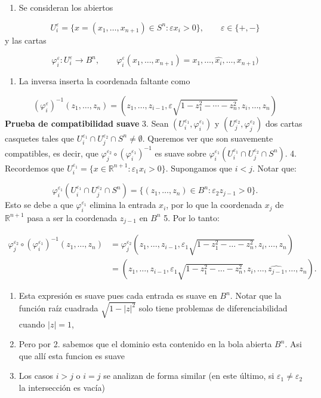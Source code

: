 \begin{bookproof}{}
\begin{enumerate}
\item Se consideran los abiertos
\end{enumerate}
\[
U_i^\varepsilon=\{x=(x_1,\dots,x_{n+1})\in S^n : \varepsilon x_i>0\},\qquad \varepsilon\in\{+,-\}
\]
y las cartas

\[
\varphi_i^\varepsilon:U_i^\varepsilon\to B^n,\qquad\varphi_i^\varepsilon(x_1,\dots,x_{n+1})=x_1,\dots,\widehat{x_i},\dots,x_{n+1})
\]
\begin{enumerate}[start=2]
\item La inversa inserta la coordenada faltante como
\end{enumerate}
\[
\left(\varphi_i^\varepsilon\right)^{-1}(z_1,\dots,z_n)=(z_1,\dots,z_{i-1},\varepsilon\sqrt{1-z_1^2-\cdots-z_n^2},z_i,\dots,z_n)
\]
\textbf{Prueba de compatibilidad suave} 3. Sean $(U_i^{\varepsilon_1}, \varphi_i^{\varepsilon_1})$ y $(U_j^{\varepsilon_2}, \varphi_j^{\varepsilon_2})$ dos cartas casquetes tales que $U_i^{\varepsilon_1} \cap U_j^{\varepsilon_2} \cap S^n \neq \emptyset$. Queremos ver que son suavemente compatibles, es decir, que $\varphi_j^{\varepsilon_2} \circ (\varphi_i^{\varepsilon_1})^{-1}$ es suave sobre $\varphi_i^{\varepsilon_1}(U_i^{\varepsilon_1} \cap U_j^{\varepsilon_2} \cap S^n)$. 4. Recordemos que $U_i^{\varepsilon_1} = \{ x \in \mathbb{R}^{n+1} : \varepsilon_1 x_i > 0 \}$. Supongamos que $i < j$. Notar que:

\[
\varphi_i^{\varepsilon_1}(U_i^{\varepsilon_1} \cap U_j^{\varepsilon_2} \cap S^n) = \{ (z_1, \dots, z_n) \in B^n : \varepsilon_2 z_{j-1} > 0 \}.
\]
Esto se debe a que $\varphi_i^{\varepsilon_1}$ elimina la entrada $x_i$, por lo que la coordenada $x_j$ de $\mathbb{R}^{n+1}$ pasa a ser la coordenada $z_{j-1}$ en $B^n$ 5. Por lo tanto:

\[
\begin{aligned}\varphi_j^{\varepsilon_2} \circ (\varphi_i^{\varepsilon_1})^{-1}(z_1, \dots, z_n) &= \varphi_j^{\varepsilon_2}(z_1, \dots, z_{i-1}, \varepsilon_1 \sqrt{1-z_1^2-\dots-z_n^2}, z_i, \dots, z_n) \\&= (z_1, \dots, z_{i-1}, \varepsilon_1 \sqrt{1-z_1^2-\dots-z_n^2}, z_i, \dots, \widehat{z_{j-1}}, \dots, z_n).\end{aligned}
\]
\begin{enumerate}[start=6]
\item Esta expresión es suave pues cada entrada es suave en $B^n$. Notar que la función raíz cuadrada $\sqrt{1-|z|^2}$ solo tiene problemas de diferenciabilidad cuando $|z|=1$,
\item Pero por 2. sabemos que el dominio esta contenido en la bola abierta $B^n$. Asi que allí esta funcion es suave
\item Los casos $i > j$ o $i = j$ se analizan de forma similar (en este último, si $\varepsilon_1 \neq \varepsilon_2$ la intersección es vacía)
\end{enumerate}
\bookqed
\end{bookproof}
